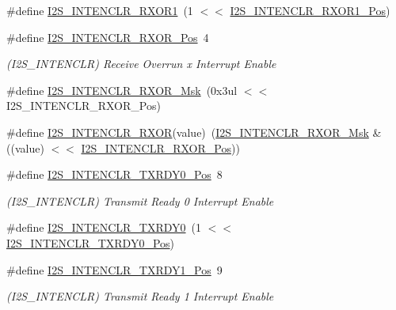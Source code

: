 \begin{DoxyCompactItemize}
\#define \mbox{\hyperlink{group___s_a_m_d21___i2_s_ga2e7eccc1cf52943b7cc80ddcd2181697}{I2\+S\+\_\+\+I\+N\+T\+E\+N\+C\+L\+R\+\_\+\+R\+X\+O\+R1}}~(1 $<$$<$ \mbox{\hyperlink{group___s_a_m_d21___i2_s_ga3ac2f9b1f31d415d4e071d8af0074b06}{I2\+S\+\_\+\+I\+N\+T\+E\+N\+C\+L\+R\+\_\+\+R\+X\+O\+R1\+\_\+\+Pos}})
\item 
\#define \mbox{\hyperlink{group___s_a_m_d21___i2_s_gafed2283ebdd42b5c187abf28e6029f0c}{I2\+S\+\_\+\+I\+N\+T\+E\+N\+C\+L\+R\+\_\+\+R\+X\+O\+R\+\_\+\+Pos}}~4
\begin{DoxyCompactList}\small\item\em (I2\+S\+\_\+\+I\+N\+T\+E\+N\+C\+LR) Receive Overrun x Interrupt Enable \end{DoxyCompactList}\item 
\#define \mbox{\hyperlink{group___s_a_m_d21___i2_s_gafb5629453a4a107273b9e3bc00bc989d}{I2\+S\+\_\+\+I\+N\+T\+E\+N\+C\+L\+R\+\_\+\+R\+X\+O\+R\+\_\+\+Msk}}~(0x3ul $<$$<$ I2\+S\+\_\+\+I\+N\+T\+E\+N\+C\+L\+R\+\_\+\+R\+X\+O\+R\+\_\+\+Pos)
\item 
\#define \mbox{\hyperlink{group___s_a_m_d21___i2_s_gab14925acd44a229f426248236fb84fc7}{I2\+S\+\_\+\+I\+N\+T\+E\+N\+C\+L\+R\+\_\+\+R\+X\+OR}}(value)~(\mbox{\hyperlink{group___s_a_m_d21___i2_s_gafb5629453a4a107273b9e3bc00bc989d}{I2\+S\+\_\+\+I\+N\+T\+E\+N\+C\+L\+R\+\_\+\+R\+X\+O\+R\+\_\+\+Msk}} \& ((value) $<$$<$ \mbox{\hyperlink{group___s_a_m_d21___i2_s_gafed2283ebdd42b5c187abf28e6029f0c}{I2\+S\+\_\+\+I\+N\+T\+E\+N\+C\+L\+R\+\_\+\+R\+X\+O\+R\+\_\+\+Pos}}))
\item 
\#define \mbox{\hyperlink{group___s_a_m_d21___i2_s_ga2ec1727e262443ba522900c51416e3c6}{I2\+S\+\_\+\+I\+N\+T\+E\+N\+C\+L\+R\+\_\+\+T\+X\+R\+D\+Y0\+\_\+\+Pos}}~8
\begin{DoxyCompactList}\small\item\em (I2\+S\+\_\+\+I\+N\+T\+E\+N\+C\+LR) Transmit Ready 0 Interrupt Enable \end{DoxyCompactList}\item 
\#define \mbox{\hyperlink{group___s_a_m_d21___i2_s_ga8a7a4cebc41d3b0f473cdb6dbb89795c}{I2\+S\+\_\+\+I\+N\+T\+E\+N\+C\+L\+R\+\_\+\+T\+X\+R\+D\+Y0}}~(1 $<$$<$ \mbox{\hyperlink{group___s_a_m_d21___i2_s_ga2ec1727e262443ba522900c51416e3c6}{I2\+S\+\_\+\+I\+N\+T\+E\+N\+C\+L\+R\+\_\+\+T\+X\+R\+D\+Y0\+\_\+\+Pos}})
\item 
\#define \mbox{\hyperlink{group___s_a_m_d21___i2_s_gad9aeb6db3a8f09c6c6d586b64a98e4c3}{I2\+S\+\_\+\+I\+N\+T\+E\+N\+C\+L\+R\+\_\+\+T\+X\+R\+D\+Y1\+\_\+\+Pos}}~9
\begin{DoxyCompactList}\small\item\em (I2\+S\+\_\+\+I\+N\+T\+E\+N\+C\+LR) Transmit Ready 1 Interrupt Enable \end{DoxyCompactList}\item 

\end{DoxyCompactItemize}
